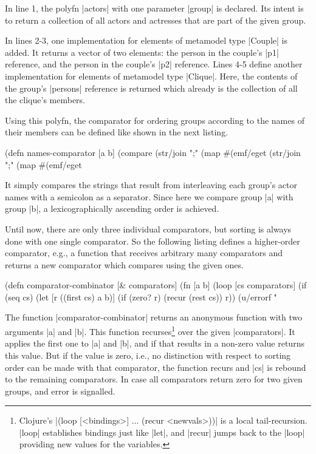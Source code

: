 \documentclass[submission]{eptcs}
\newcommand{\code}{\clojureinline}
\begin{document}
In line 1, the polyfn \code|actors| with one parameter \code|group| is
declared.  Its intent is to return a collection of all actors and actresses
that are part of the given group.

In lines 2-3, one implementation for elements of metamodel type \code|Couple|
is added.  It returns a vector of two elements: the person in the couple's
\code|p1| reference, and the person in the couple's \code|p2| reference.  Lines
4-5 define another implementation for elements of metamodel type \code|Clique|.
Here, the contents of the group's \code|persons| reference is returned which
already is the collection of all the clique's members.

Using this polyfn, the comparator for ordering groups according to the names of
their members can be defined like shown in the next listing.

\begin{clojurecode}
(defn names-comparator [a b]
  (compare (str/join ";" (map #(emf/eget %
           (str/join ";" (map #(emf/eget %
\end{clojurecode}

It simply compares the strings that result from interleaving each group's actor
names with a semicolon as a separator.  Since here we compare group \code|a|
with group \code|b|, a lexicographically ascending order is achieved.

Until now, there are only three individual comparators, but sorting is always
done with one single comparator.  So the following listing defines a
higher-order comparator, e.g., a function that receives arbitrary many
comparators and returns a new comparator which compares using the given ones.

\begin{clojurecode}
(defn comparator-combinator [& comparators]
  (fn [a b]
    (loop [cs comparators]
      (if (seq cs)
        (let [r ((first cs) a b)]
          (if (zero? r)
            (recur (rest cs))
            r))
        (u/errorf "%
\end{clojurecode}

The function \code|comparator-combinator| returns an anonymous function with
two arguments \code|a| and \code|b|.  This function recurses\footnote{Clojure's
  \code|(loop [<bindings>] ... (recur <newvals>))| is a local tail-recursion.
  \code|loop| establishes bindings just like \code|let|, and \code|recur| jumps
  back to the \code|loop| providing new values for the variables.} over the
given \code|comparators|.  It applies the first one to \code|a| and \code|b|,
and if that results in a non-zero value returns this value.  But if the value
is zero, i.e., no distinction with respect to sorting order can be made with
that comparator, the function recurs and \code|cs| is rebound to the remaining
comparators.  In case all comparators return zero for two given groups, and
error is signalled.
\end{document}
